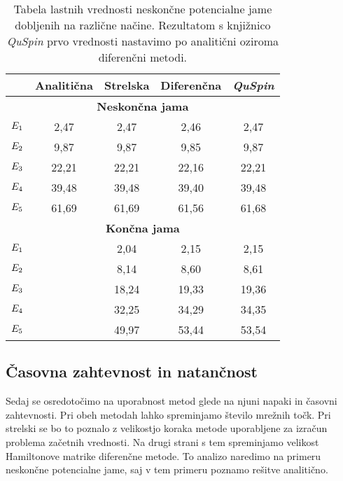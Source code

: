 \documentclass{porocilo}
\begin{document}
\begin{table}
    \centering
    \caption{\label{tab:eigen} Tabela lastnih vrednosti neskončne potencialne jame dobljenih na različne načine. Rezultatom s knjižnico \textit{QuSpin} prvo vrednosti nastavimo po analitični oziroma diferenčni metodi.}
    \begin{tabular}{c c c c c}
                    & Analitična & Strelska & Diferenčna & \textit{QuSpin} \\
        \toprule
        \multicolumn{5}{c}{\textbf{Neskončna jama}}                        \\
        $E_{\rm 1}$ & 2,47       & 2,47     & 2,46       & 2,47            \\
        $E_{\rm 2}$ & 9,87       & 9,87     & 9,85       & 9,87            \\
        $E_{\rm 3}$ & 22,21      & 22,21    & 22,16      & 22,21           \\
        $E_{\rm 4}$ & 39,48      & 39,48    & 39,40      & 39,48           \\
        $E_{\rm 5}$ & 61,69      & 61,69    & 61,56      & 61,68           \\
        \multicolumn{5}{c}{\textbf{Končna jama}}                           \\
        $E_{\rm 1}$ &            & 2,04     & 2,15       & 2,15            \\
        $E_{\rm 2}$ &            & 8,14     & 8,60       & 8,61            \\
        $E_{\rm 3}$ &            & 18,24    & 19,33      & 19,36           \\
        $E_{\rm 4}$ &            & 32,25    & 34,29      & 34,35           \\
        $E_{\rm 5}$ &            & 49,97    & 53,44      & 53,54           \\
    \end{tabular}
\end{table}


\subsection{Časovna zahtevnost in natančnost}
Sedaj se osredotočimo na uporabnost metod glede na njuni napaki in časovni zahtevnosti. Pri obeh metodah lahko spreminjamo število mrežnih točk. Pri strelski se bo to poznalo z velikostjo koraka metode uporabljene za izračun problema začetnih vrednosti. Na drugi strani s tem spreminjamo velikost Hamiltonove matrike diferenčne metode. To analizo naredimo na primeru neskončne potencialne jame, saj v tem primeru poznamo rešitve analitično.
\end{document}
